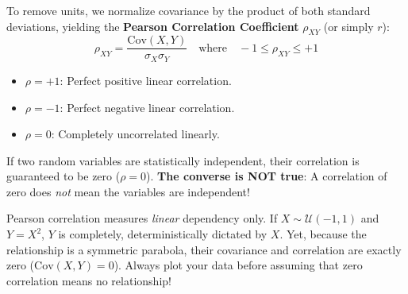 To remove units, we normalize covariance by the product of both standard deviations, yielding the \textbf{Pearson Correlation Coefficient} $\rho_{XY}$ (or simply $r$):
\begin{equation}
\rho_{XY} = \frac{\text{Cov}(X, Y)}{\sigma_X \sigma_Y} \quad \text{where} \quad -1 \le \rho_{XY} \le +1\label{eq:correlation_def}
\end{equation}
\begin{itemize}
    \item $\rho = +1$: Perfect positive linear correlation.
    \item $\rho = -1$: Perfect negative linear correlation.
    \item $\rho = 0$: Completely uncorrelated linearly.
\end{itemize}

\begin{warning}
If two random variables are statistically independent, their correlation is guaranteed to be zero ($\rho = 0$). 
\textbf{The converse is NOT true}: A correlation of zero does \textit{not} mean the variables are independent! 

Pearson correlation measures \textit{linear} dependency only. If $X \sim \mathcal{U}(-1, 1)$ and $Y = X^2$, $Y$ is completely, deterministically dictated by $X$. Yet, because the relationship is a symmetric parabola, their covariance and correlation are exactly zero ($\text{Cov}(X, Y) = 0$). Always plot your data before assuming that zero correlation means no relationship!
\end{warning}

